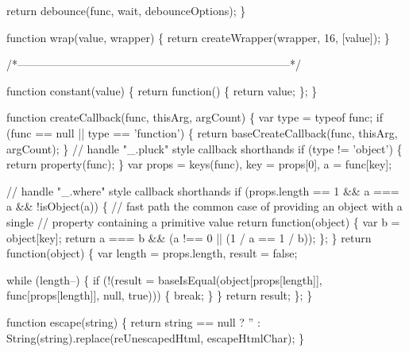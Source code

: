 \begin{DoxyCodeInclude}
      \textcolor{keywordflow}{return} debounce(func, wait, debounceOptions);
    \}

    \textcolor{keyword}{function} wrap(value, wrapper) \{
      \textcolor{keywordflow}{return} createWrapper(wrapper, 16, [value]);
    \}

    \textcolor{comment}{/*--------------------------------------------------------------------------*/}

    \textcolor{keyword}{function} constant(value) \{
      \textcolor{keywordflow}{return} \textcolor{keyword}{function}() \{
        \textcolor{keywordflow}{return} value;
      \};
    \}

    \textcolor{keyword}{function} createCallback(func, thisArg, argCount) \{
      var type = typeof func;
      \textcolor{keywordflow}{if} (func == null || type == \textcolor{stringliteral}{'function'}) \{
        \textcolor{keywordflow}{return} baseCreateCallback(func, thisArg, argCount);
      \}
      \textcolor{comment}{// handle "\_.pluck" style callback shorthands}
      \textcolor{keywordflow}{if} (type != \textcolor{stringliteral}{'object'}) \{
        \textcolor{keywordflow}{return} property(func);
      \}
      var props = keys(func),
          key = props[0],
          a = func[key];

      \textcolor{comment}{// handle "\_.where" style callback shorthands}
      \textcolor{keywordflow}{if} (props.length == 1 && a === a && !isObject(a)) \{
        \textcolor{comment}{// fast path the common case of providing an object with a single}
        \textcolor{comment}{// property containing a primitive value}
        \textcolor{keywordflow}{return} \textcolor{keyword}{function}(object) \{
          var b = \textcolor{keywordtype}{object}[key];
          \textcolor{keywordflow}{return} a === b && (a !== 0 || (1 / a == 1 / b));
        \};
      \}
      \textcolor{keywordflow}{return} \textcolor{keyword}{function}(object) \{
        var length = props.length,
            result = \textcolor{keyword}{false};

        \textcolor{keywordflow}{while} (length--) \{
          \textcolor{keywordflow}{if} (!(result = baseIsEqual(\textcolor{keywordtype}{object}[props[length]], func[props[length]], null, \textcolor{keyword}{true}))) \{
            \textcolor{keywordflow}{break};
          \}
        \}
        \textcolor{keywordflow}{return} result;
      \};
    \}

    \textcolor{keyword}{function} escape(\textcolor{keywordtype}{string}) \{
      \textcolor{keywordflow}{return} \textcolor{keywordtype}{string} == null ? \textcolor{stringliteral}{''} : String(\textcolor{keywordtype}{string}).replace(reUnescapedHtml, escapeHtmlChar);
    \}


\end{DoxyCodeInclude}
